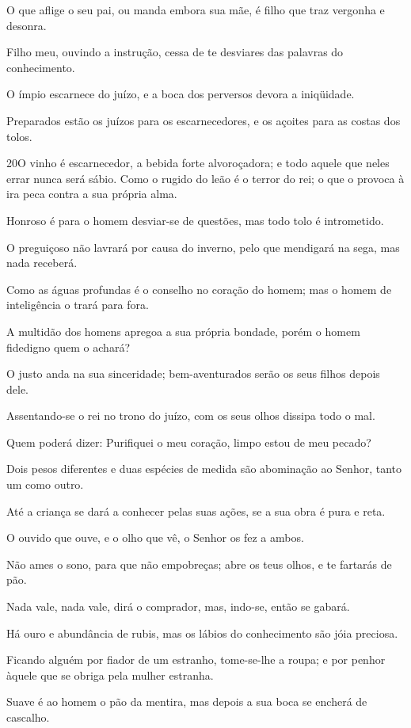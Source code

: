 O que aflige o seu pai, ou manda embora sua mãe, é filho que traz
vergonha e desonra.

Filho meu, ouvindo a instrução, cessa de te desviares das
palavras do conhecimento.

O ímpio escarnece do juízo, e a boca dos perversos devora a
iniqüidade.

Preparados estão os juízos para os escarnecedores, e os açoites
para as costas dos tolos.

\medskip

\lettrine{20}{}O vinho é escarnecedor, a bebida forte
alvoroçadora; e todo aquele que neles errar nunca será sábio.
 Como o rugido do leão é o terror do rei; o que o
provoca à ira peca contra a sua própria alma.

Honroso é para o homem desviar-se de questões, mas todo tolo é
intrometido.

O preguiçoso não lavrará por causa do inverno, pelo que mendigará
na sega, mas nada receberá.

Como as águas profundas é o conselho no coração do homem; mas o
homem de inteligência o trará para fora.

A multidão dos homens apregoa a sua própria bondade, porém o homem
fidedigno quem o achará?

O justo anda na sua sinceridade; bem-aventurados serão os seus
filhos depois dele.

Assentando-se o rei no trono do juízo, com os seus olhos dissipa
todo o mal.

Quem poderá dizer: Purifiquei o meu coração, limpo estou de meu
pecado?

Dois pesos diferentes e duas espécies de medida são abominação ao
Senhor, tanto um como outro.

Até a criança se dará a conhecer pelas suas ações, se a sua obra
é pura e reta.

O ouvido que ouve, e o olho que vê, o Senhor os fez a ambos.

Não ames o sono, para que não empobreças; abre os teus olhos, e
te fartarás de pão.

Nada vale, nada vale, dirá o comprador, mas, indo-se, então se
gabará.

Há ouro e abundância de rubis, mas os lábios do conhecimento são
jóia preciosa.

Ficando alguém por fiador de um estranho, tome-se-lhe a roupa; e
por penhor àquele que se obriga pela mulher estranha.

Suave é ao homem o pão da mentira, mas depois a sua boca se
encherá de cascalho.

